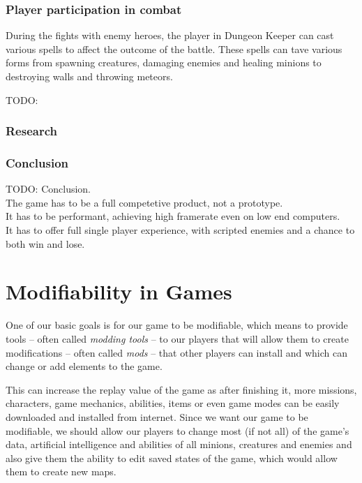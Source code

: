 \subsubsection{Player participation in combat}

During the fights with enemy heroes, the player in Dungeon Keeper can cast various spells to affect the outcome of the battle.
These spells can tave various forms from spawning creatures, damaging enemies and healing minions to destroying walls and throwing
meteors.

TODO:

\subsubsection{Research}

\subsubsection{Conclusion}

TODO: Conclusion.
\\ The game has to be a full competetive product, not a prototype.
\\ It has to be performant, achieving high framerate even on low end computers.
\\ It has to offer full single player experience, with scripted enemies and a chance to both win and lose.

\section{Modifiability in Games}

One of our basic goals is for our game to be modifiable, which means to provide tools -- often called \emph{modding tools} -- to our players
that will allow them to create modifications -- often called \emph{mods} -- that other players can install and which can change or
add elements to the game.

This can increase the replay value of the game as after finishing it, more missions, characters, game mechanics, abilities, items
or even game modes can be easily downloaded and installed from internet. Since we want our game to be modifiable, we should allow our players
to change most (if not all) of the game's data, artificial intelligence and abilities of all minions, creatures and enemies and also give
them the ability to edit saved states of the game, which would allow them to create new maps.

